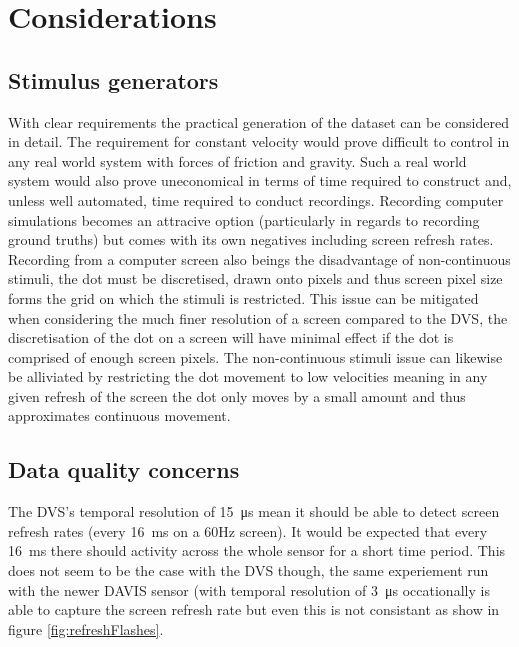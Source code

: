\section{Considerations}
\subsection{Stimulus generators}
With clear requirements the practical generation of the dataset can be considered in detail.
The requirement for constant velocity would prove difficult to control in any real world system with forces of friction and gravity.
Such a real world system would also prove uneconomical in terms of time required to construct and, unless well automated, time required to conduct recordings. 
Recording computer simulations becomes an attracive option (particularly in regards to recording ground truths) but comes with its own negatives including screen refresh rates.
Recording from a computer screen also beings the disadvantage of non-continuous stimuli, the dot must be discretised, drawn onto pixels and thus screen pixel size forms the grid on which the stimuli is restricted. 
This issue can be mitigated when considering the much finer resolution of a screen compared to the DVS, the discretisation of the dot on a screen will have minimal effect if the dot is comprised of enough screen pixels.
The non-continuous stimuli issue can likewise be alliviated by restricting the dot movement to low velocities meaning in any given refresh of the screen the dot only moves by a small amount and thus approximates continuous movement. 


\subsection{Data quality concerns}

The DVS's temporal resolution of \SI{15}{\micro\second} mean it should be able to detect screen refresh rates (every \SI{16}{\milli\second} on a 60Hz screen). 
It would be expected that every \SI{16}{\milli\second} there should activity across the whole sensor for a short time period. 
This does not seem to be the case with the DVS though, the same experiement run with the newer DAVIS sensor (with temporal resolution of \SI{3}{\micro\second} occationally is able to capture the screen refresh rate but even this is not consistant as show in figure \ref{fig:refreshFlashes}.

